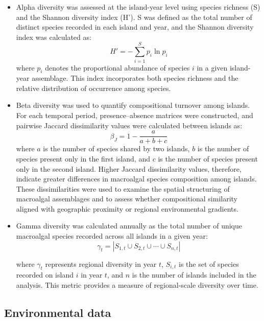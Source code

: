 \documentclass[a4paper,fleqn]{cas-sc}
\begin{document}
\begin{itemize}
    \item Alpha diversity was assessed at the island-year level using species richness (S) and the Shannon diversity index (H'). S was defined as the total number of distinct species recorded in each island and year, and the Shannon diversity index was calculated as:
    \begin{equation}
        H' = - \sum_{i=1}^{S} p_{i} \ln{p_i}
    \end{equation}
    where $p_i$ denotes the proportional abundance of species $i$ in a given island-year assemblage. This index incorporates both species richness and the relative distribution of occurrence among species.

    \item Beta diversity was used to quantify compositional turnover among islands. For each temporal period, presence--absence matrices were constructed, and pairwise Jaccard dissimilarity values were calculated between islands as:
    \begin{equation}
    \beta_J = 1 - \frac{a}{a + b + c}
    \end{equation}
    where $a$ is the number of species shared by two islands, $b$ is the number of species present only in the first island, and $c$ is the number of species present only in the second island. Higher Jaccard dissimilarity values, therefore, indicate greater differences in macroalgal species composition among islands. These dissimilarities were used to examine the spatial structuring of macroalgal assemblages and to assess whether compositional similarity aligned with geographic proximity or regional environmental gradients.

    \item Gamma diversity was calculated annually as the total number of unique macroalgal species recorded across all islands in a given year:
    \begin{equation}
    \gamma_t = \left| S_{1,t} \cup S_{2,t} \cup \cdots \cup S_{n,t} \right|
    \end{equation}
    
    where $\gamma_t$ represents regional diversity in year $t$, $S_{i,t}$ is the set of species recorded on island $i$ in year $t$, and $n$ is the number of islands included in the analysis. This metric provides a measure of regional-scale diversity over time.
\end{itemize} 

\subsection{Environmental data}
\end{document}
